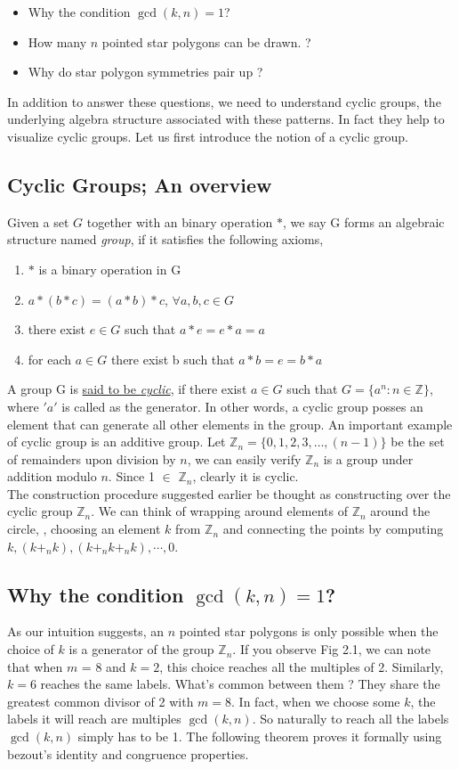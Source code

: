 \documentclass{article}
\begin{document}
\begin{itemize}
	\item Why the condition $\gcd(k,n) = 1$?
	\item How many $n$ pointed star polygons can be drawn. ?
	\item Why do star polygon symmetries pair up ?
\end{itemize}
In addition to answer these questions, we need to understand cyclic groups, the underlying algebra structure associated with these patterns. In fact they help to visualize cyclic groups. Let us first introduce the notion of a cyclic group.

\subsection*{Cyclic Groups; An overview}
Given a set $G$ together with an binary operation $*$, we say G forms an algebraic structure named \textit{group}, if it satisfies the following axioms,
\begin{enumerate}
    \item $*$ is a binary operation in G
    \item $a*(b*c)=(a*b)*c$, $\forall a,b,c \in G$
    \item there exist $e \in G$ such that $a*e=e*a=a$
    \item for each $a \in G$ there exist b such that $a*b=e=b*a$
\end{enumerate}
A group G is \underline{said to be \textit{cyclic}}, if there exist $a \in G$ such that $G=\{a^{n}:n \in \mathbb{Z}\}$, where $'a'$ is called as the generator. In other words, a cyclic group posses an element that can generate all other elements in the group. An important example of cyclic group is an additive group. Let $\mathbb{Z}_n =\{0,1,2,3,\ldots,(n-1)\}$ be the set of remainders upon division by $n$, we can easily verify $\mathbb{Z}_n$ is a group under addition modulo $n$. Since 1 $\in$  $\mathbb{Z}_n$, clearly it is cyclic.\\[2mm]
The construction procedure suggested earlier be thought as constructing over the cyclic group $\mathbb{Z}_n$. We can think of wrapping around elements of $\mathbb{Z}_n$ around the circle, , choosing an element $k$ from $\mathbb{Z}_n$ and connecting the points by computing $k, (k +_n k) , (k +_n k +_n k),\cdots, 0$.

\subsection*{Why the condition $\gcd(k,n)=1$?}
As our intuition suggests, an $n$ pointed star polygons is only possible when the choice of $k$ is a generator of the group $\mathbb{Z}_ n$. If you observe Fig 2.1, we can note that when $m$ = 8 and $k = 2$, this choice reaches all the multiples of 2. Similarly, $k = 6$ reaches the same labels. What's common between them ? They share the greatest common divisor of 2 with $m =8$. In fact, when we choose some $k$, the labels it will reach are multiples $\gcd(k,n)$. So naturally to reach all the labels $\gcd(k,n)$ simply has to be 1. The following theorem proves it formally using bezout's identity and congruence properties. 
\end{document}
